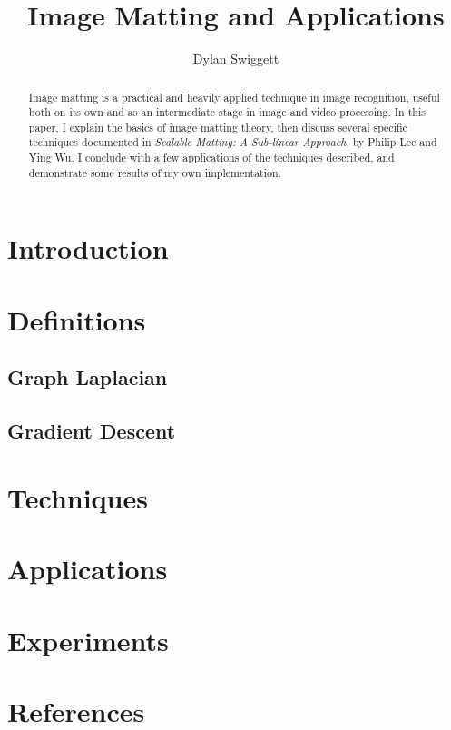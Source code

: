 \documentclass[10pt,a4paper]{article}
\author{Dylan Swiggett}
\title{Image Matting and Applications}
\begin{document}
\maketitle

\begin{abstract}
Image matting is a practical and heavily applied technique in image recognition, useful both on its own and as an intermediate stage in image and video processing. In this paper, I explain the basics of image matting theory, then discuss several specific techniques documented in \textit{Scalable Matting: A Sub-linear Approach}, by Philip Lee and Ying Wu. I conclude with a few applications of the techniques described, and demonstrate some results of my own implementation.
\end{abstract}

\tableofcontents
\pagebreak

\section{Introduction}

\section{Definitions}
\subsection{Graph Laplacian}
\subsection{Gradient Descent}
\section{Techniques}
\section{Applications}
\section{Experiments}
\section{References}
\end{document}
